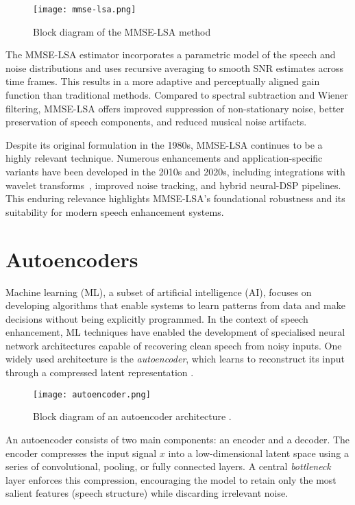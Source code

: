 \begin{figure}[H]
    \centering
    \texttt{[image: mmse-lsa.png]}
    \caption{\label{fig:mmse_lsa_block} Block diagram of the MMSE-LSA method}
\end{figure}

The MMSE-LSA estimator incorporates a parametric model of the speech and noise distributions and uses recursive averaging to smooth SNR estimates across time frames. This results in a more adaptive and perceptually aligned gain function than traditional methods. Compared to spectral subtraction and Wiener filtering, MMSE-LSA offers improved suppression of non-stationary noise, better preservation of speech components, and reduced musical noise artifacts.

Despite its original formulation in the 1980s, MMSE-LSA continues to be a highly relevant technique. Numerous enhancements and application-specific variants have been developed in the 2010s and 2020s, including integrations with wavelet transforms~\cite{wei2016mmse}, improved noise tracking, and hybrid neural-DSP pipelines. This enduring relevance highlights MMSE-LSA's foundational robustness and its suitability for modern speech enhancement systems.

\section{Autoencoders}
\label{sec:autoencoders}

Machine learning (ML), a subset of artificial intelligence (AI), focuses on developing algorithms that enable systems to learn patterns from data and make decisions without being explicitly programmed. In the context of speech enhancement, ML techniques have enabled the development of specialised neural network architectures capable of recovering clean speech from noisy inputs. One widely used architecture is the \textit{autoencoder}, which learns to reconstruct its input through a compressed latent representation \cite{azarang2020review}.

\begin{figure}[h]
    \centering
    \texttt{[image: autoencoder.png]}
    \caption{\label{fig:autoencoder} Block diagram of an autoencoder architecture \cite{vachhani2017dae}.}
\end{figure}

An autoencoder consists of two main components: an encoder and a decoder. The encoder compresses the input signal \(x\) into a low-dimensional latent space using a series of convolutional, pooling, or fully connected layers. A central \textit{bottleneck} layer enforces this compression, encouraging the model to retain only the most salient features (speech structure) while discarding irrelevant noise.


